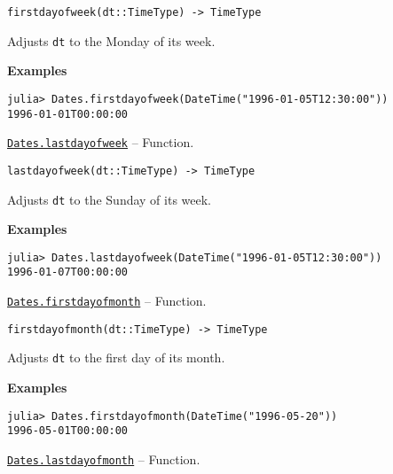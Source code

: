 \begin{adjustwidth}{2em}{0pt}


\begin{verbatim}
firstdayofweek(dt::TimeType) -> TimeType
\end{verbatim}

Adjusts \texttt{dt} to the Monday of its week.

\textbf{Examples}


\begin{verbatim}
julia> Dates.firstdayofweek(DateTime("1996-01-05T12:30:00"))
1996-01-01T00:00:00
\end{verbatim}



\end{adjustwidth}
\hypertarget{15555713849502356755}{}
\hyperlink{15555713849502356755}{\texttt{Dates.lastdayofweek}}  -- {Function.}

\begin{adjustwidth}{2em}{0pt}


\begin{verbatim}
lastdayofweek(dt::TimeType) -> TimeType
\end{verbatim}

Adjusts \texttt{dt} to the Sunday of its week.

\textbf{Examples}


\begin{verbatim}
julia> Dates.lastdayofweek(DateTime("1996-01-05T12:30:00"))
1996-01-07T00:00:00
\end{verbatim}



\end{adjustwidth}
\hypertarget{944292496394173921}{}
\hyperlink{944292496394173921}{\texttt{Dates.firstdayofmonth}}  -- {Function.}

\begin{adjustwidth}{2em}{0pt}


\begin{verbatim}
firstdayofmonth(dt::TimeType) -> TimeType
\end{verbatim}

Adjusts \texttt{dt} to the first day of its month.

\textbf{Examples}


\begin{verbatim}
julia> Dates.firstdayofmonth(DateTime("1996-05-20"))
1996-05-01T00:00:00
\end{verbatim}



\end{adjustwidth}
\hypertarget{14220689943148611628}{}
\hyperlink{14220689943148611628}{\texttt{Dates.lastdayofmonth}}  -- {Function.}

